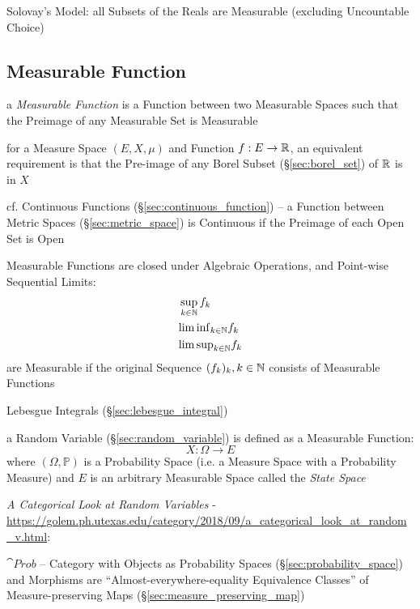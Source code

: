 Solovay's Model: all Subsets of the Reals are Measurable (excluding Uncountable
Choice)



\subsection{Measurable Function}\label{sec:measurable_function}

a \emph{Measurable Function} is a Function between two Measurable Spaces such
that the Preimage of any Measurable Set is Measurable

for a Measure Space $(E, X, \mu)$ and Function $f : E \rightarrow \mathbb{R}$, an
equivalent requirement is that the Pre-image of any Borel Subset
(\S\ref{sec:borel_set}) of $\mathbb{R}$ is in $X$

\fist cf. Continuous Functions (\S\ref{sec:continuous_function}) -- a Function
between Metric Spaces (\S\ref{sec:metric_space}) is Continuous if the Preimage
of each Open Set is Open

Measurable Functions are closed under Algebraic Operations, and Point-wise
Sequential Limits:
\begin{align*}
  & \sup_{k\in\mathbb{N}} f_k \\
  & {\lim \inf}_{k\in\mathbb{N}} f_k \\
  & {\lim \sup}_{k\in\mathbb{N}} f_k \\
\end{align*}
are Measurable if the original Sequence $(f_k)_k, k \in \mathbb{N}$ consists of
Measurable Functions

\fist Lebesgue Integrals (\S\ref{sec:lebesgue_integral})

a Random Variable (\S\ref{sec:random_variable}) is defined as a Measurable
Function:
\[
  X : \Omega \rightarrow E
\]
where $(\Omega,\mathbb{P})$ is a Probability Space (i.e. a Measure Space with a
Probability Measure) and $E$ is an arbitrary Measurable Space called the
\emph{State Space}

\emph{A Categorical Look at Random Variables} -
\url{https://golem.ph.utexas.edu/category/2018/09/a_categorical_look_at_random_v.html}:

$\cat{Prob}$ -- Category with Objects as Probability Spaces
(\S\ref{sec:probability_space}) and Morphisms are ``Almost-everywhere-equality
Equivalence Classes'' of Measure-preserving Maps
(\S\ref{sec:measure_preserving_map})

